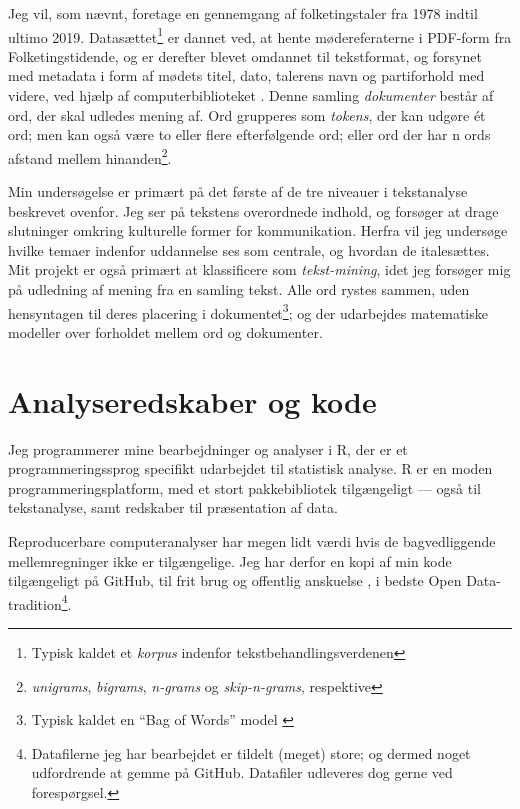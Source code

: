 Jeg vil, som nævnt, foretage en gennemgang af folketingstaler fra 1978 indtil ultimo 2019.
Datasættet\footnote{Typisk kaldet et \textit{korpus} indenfor tekstbehandlingsverdenen} er dannet ved, at hente mødereferaterne i PDF-form fra Folketingstidende, og er derefter blevet omdannet til tekstformat, og forsynet med metadata i form af mødets titel, dato, talerens navn og partiforhold med videre, ved hjælp af computerbiblioteket  \autocite{pedersenFolketinget2019}.
Denne samling \textit{dokumenter} består af ord, der skal udledes mening af.
Ord grupperes som \textit{tokens}, der kan udgøre ét ord; men kan også være to eller flere efterfølgende ord; eller ord der har n ords afstand mellem hinanden\footnote{\textit{unigrams}, \textit{bigrams}, \textit{n-grams} og \textit{skip-n-grams}, respektive}.

Min undersøgelse er primært på det første af de tre niveauer i tekstanalyse beskrevet ovenfor.
Jeg ser på tekstens overordnede indhold, og forsøger at drage slutninger omkring kulturelle former for kommunikation.
Herfra vil jeg undersøge hvilke temaer indenfor uddannelse ses som centrale, og hvordan de italesættes.
Mit projekt er også primært at klassificere som \textit{tekst-mining}, idet jeg forsøger mig på udledning af mening fra en samling tekst.
Alle ord rystes sammen, uden hensyntagen til deres placering i dokumentet\footnote{Typisk kaldet en “Bag of Words” model \autocite[s. 28]{kwartlerTextMiningPractice2017}}; og der udarbejdes matematiske modeller over forholdet mellem ord og dokumenter.

\section{Analyseredskaber og kode}

Jeg programmerer mine bearbejdninger og analyser i R, der er et programmeringssprog specifikt udarbejdet til statistisk analyse\autocite{therfoundationWhat}.
R er en moden programmeringsplatform, med et stort pakkebibliotek tilgængeligt — også til tekstanalyse, samt redskaber til præsentation af data.

Reproducerbare computeranalyser har megen lidt værdi hvis de bagvedliggende mellemregninger ikke er tilgængelige.
Jeg har derfor en kopi af min kode tilgængeligt på GitHub, til frit brug og offentlig anskuelse \autocite{andersenMasterthesis2020}, i bedste Open Data-tradition\footnote{Datafilerne jeg har bearbejdet er tildelt (meget) store; og dermed noget udfordrende at gemme på GitHub. Datafiler udleveres dog gerne ved forespørgsel.}.

